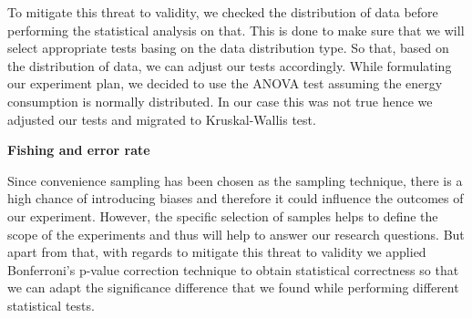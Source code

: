 To mitigate this threat to validity, we checked the distribution of data before performing the statistical analysis on that. This is done to make sure that we will select appropriate tests basing on the data distribution type. So that, based on the distribution of data, we can adjust our tests accordingly. While formulating our experiment plan, we decided to use the ANOVA test assuming the energy consumption is normally distributed. In our case this was not true hence we adjusted our tests and migrated to Kruskal-Wallis test. \newline

\textbf{Fishing and error rate}

Since convenience sampling has been chosen as the sampling technique, there is a high chance of introducing biases and therefore it could influence the outcomes of our experiment. However, the specific selection of samples helps to define the scope of the experiments and thus will help to answer our research questions. But apart from that, with regards to mitigate this threat to validity we applied Bonferroni's p-value correction technique to obtain statistical correctness so that we can adapt the significance difference that we found while performing different statistical tests. 


